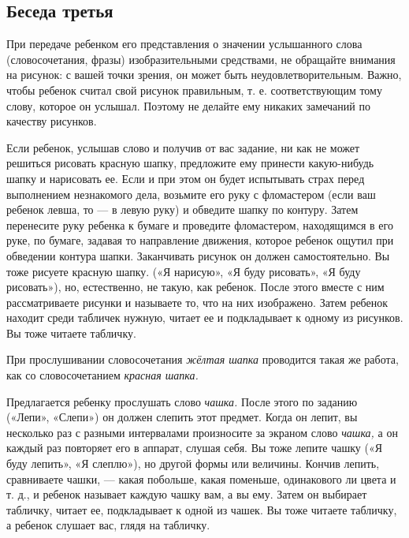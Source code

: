 \documentclass[a5paper]{book}
\renewcommand{\emph}[1]{\textit{#1}}
\begin{document}
\subsection*{Беседа третья}

При передаче ребенком его представления о значении услышанного слова
(словосочетания, фразы) изобразительными средствами, не обращайте
внимания на рисунок: с вашей точки зрения, он может быть
неудовлетворительным. Важно, чтобы ребенок считал свой рисунок
правильным, т. е. соответствующим тому слову, которое он услышал.
Поэтому не делайте ему никаких замечаний по качеству рисунков.

Если ребенок, услышав слово и получив от вас задание, ни как не может
решиться рисовать красную шапку, предложите ему принести какую-нибудь
шапку и нарисовать ее. Если и при этом он будет испытывать страх перед
выполнением незнакомого дела, возьмите его руку с фломастером (если ваш
ребенок левша, то --- в левую руку) и обведите шапку по контуру. Затем
перенесите руку ребенка к бумаге и проведите фломастером, находящимся в
его руке, по бумаге, задавая то направление движения, которое ребенок
ощутил при обведении контура шапки. Заканчивать рисунок он должен
самостоятельно. Вы тоже рисуете красную шапку. («Я нарисую», «Я буду
рисовать», «Я буду рисовать»), но, естественно, не такую, как ребенок.
После этого вместе с ним рассматриваете рисунки и называете то, что на
них изображено. Затем ребенок находит среди табличек нужную, читает ее и
подкладывает к одному из рисунков. Вы тоже читаете табличку.

При прослушивании словосочетания \emph{жёлтая шапка} проводится такая же
работа, как со словосочетанием \emph{красная шапка.}

Предлагается ребенку прослушать слово \emph{чашка.} После этого по
заданию («Лепи», «Слепи») он должен слепить этот предмет. Когда он
лепит, вы несколько раз с разными интервалами произносите за экраном
слово \emph{чашка,} а он каждый раз повторяет его в аппарат, слушая
себя. Вы тоже лепите чашку («Я буду лепить», «Я слеплю»), но другой
формы или величины. Кончив лепить, сравниваете чашки, --- какая
побольше, какая поменьше, одинакового ли цвета и т. д., и ребенок
называет каждую чашку вам, а вы ему. Затем он выбирает табличку, читает
ее, подкладывает к одной из чашек. Вы тоже читаете табличку, а ребенок
слушает вас, глядя на табличку.
\end{document}
